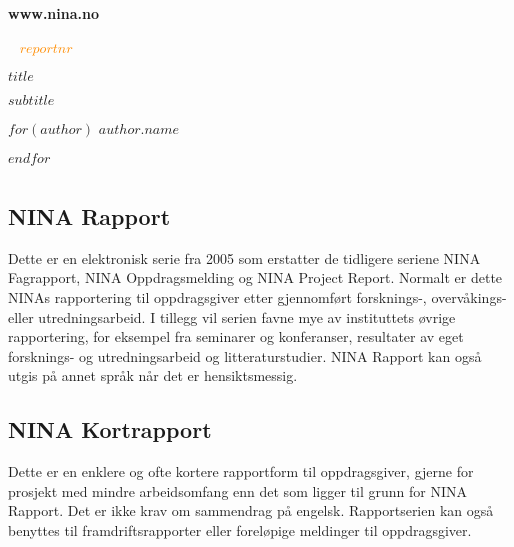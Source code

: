 \documentclass[11pt, a4paper]{article}
\newcommand{\shadOrange}[1]{\textcolor{lightOrange}{#1}}
\newcommand{\orange}[1]{\textcolor{darkOrange}{#1}}
\newcommand{\darkGrey}[1]{\textcolor{darkgrey}{#1}}
\begin{document}
\begin{titlepage}

\thispagestyle{titlefooter}
\begin{center}
\vspace{-1cm}
\Large\shadOrange{\textbf{www.nina.no}}
\end{center}
\vspace{2cm}

\Huge{\darkGrey{~}} \hspace{.7cm} \textbf{\orange{$reportnr$}}
\vspace{2cm}

\Huge{$title$} \par\vspace{.5cm}
\huge{$subtitle$} \par\vspace{1cm}

$for(author)$
\LARGE{$author.name$} \par
$endfor$

\restoregeometry
\end{titlepage}
\cfoot{}

\section*{}


\subsection*{\small{NINA Rapport}}
{\small Dette er en elektronisk serie fra 2005 som erstatter de tidligere seriene NINA Fagrapport, NINA Oppdragsmelding og NINA Project Report. Normalt er dette NINAs rapportering til oppdragsgiver etter gjennomført forsknings\hyp{}, overvåkings\hyp{} eller utredningsarbeid. I tillegg vil serien favne mye av instituttets øvrige rapportering, for eksempel fra seminarer og konferanser, resultater av eget forsknings\hyp{} og utredningsarbeid og litteraturstudier. NINA Rapport kan også utgis på annet språk når det er hensiktsmessig.}

\subsection*{\small{NINA Kortrapport}}
{\small Dette er en enklere og ofte kortere rapportform til oppdragsgiver, gjerne for prosjekt med mindre arbeidsomfang enn det som ligger til grunn for NINA Rapport. Det er ikke krav om sammendrag på engelsk. Rapportserien kan også benyttes til framdriftsrapporter eller foreløpige meldinger til oppdragsgiver.}
\end{document}
